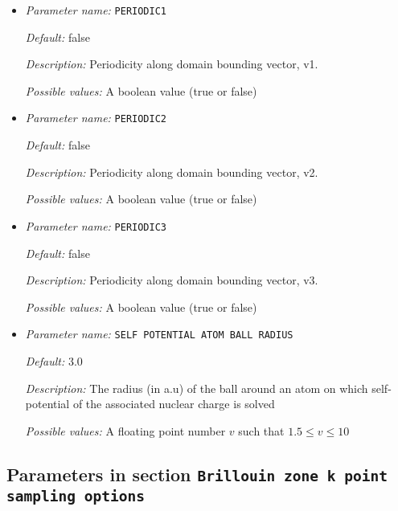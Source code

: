 \begin{itemize}
\item {\it Parameter name:} {\tt PERIODIC1}
\label{parameters:Boundary conditions/PERIODIC1}
\label{parameters:Boundary_20conditions/PERIODIC1}


{\it Default:} false


{\it Description:} Periodicity along domain bounding vector, v1.


{\it Possible values:} A boolean value (true or false)
\item {\it Parameter name:} {\tt PERIODIC2}
\label{parameters:Boundary conditions/PERIODIC2}
\label{parameters:Boundary_20conditions/PERIODIC2}


{\it Default:} false


{\it Description:} Periodicity along domain bounding vector, v2.


{\it Possible values:} A boolean value (true or false)
\item {\it Parameter name:} {\tt PERIODIC3}
\label{parameters:Boundary conditions/PERIODIC3}
\label{parameters:Boundary_20conditions/PERIODIC3}


{\it Default:} false


{\it Description:} Periodicity along domain bounding vector, v3.


{\it Possible values:} A boolean value (true or false)
\item {\it Parameter name:} {\tt SELF POTENTIAL ATOM BALL RADIUS}
\label{parameters:Boundary conditions/SELF POTENTIAL ATOM BALL RADIUS}
\label{parameters:Boundary_20conditions/SELF_20POTENTIAL_20ATOM_20BALL_20RADIUS}


{\it Default:} 3.0


{\it Description:} The radius (in a.u) of the ball around an atom on which self-potential of the associated nuclear charge is solved


{\it Possible values:} A floating point number $v$ such that $1.5 \leq v \leq 10$
\end{itemize}

\subsection{Parameters in section \tt Brillouin zone k point sampling options}
\label{parameters:Brillouin_20zone_20k_20point_20sampling_20options}

